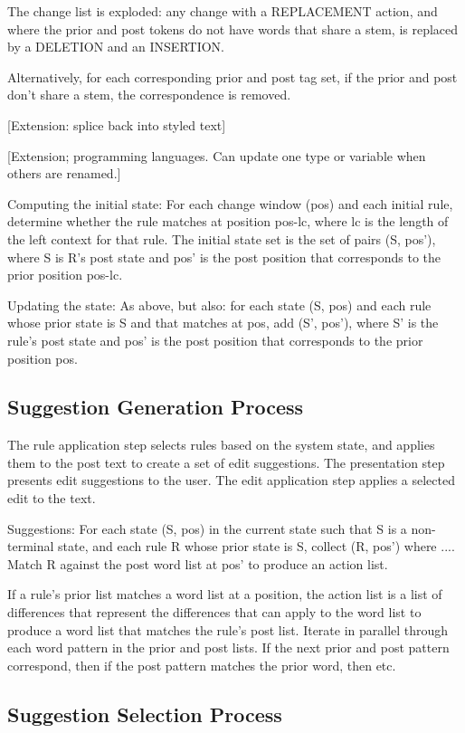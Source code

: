 \documentclass{article}
\begin{document}
The change list is exploded: any change with a REPLACEMENT action, and where the prior and post tokens do not have words that share a stem, is replaced by a DELETION and an INSERTION.

Alternatively, for each corresponding prior and post tag set, if the prior and post don't share a stem, the correspondence is removed.

[Extension: splice back into styled text]

[Extension; programming languages.  Can update one type or variable when others are renamed.]

Computing the initial state: For each change window (pos) and each initial rule, determine whether the rule matches at position pos-lc, where lc is the length of the left context for that rule.  The initial state set is the set of pairs (S, pos'), where S is R's post state and pos' is the post position that corresponds to the prior position pos-lc.

Updating the state: As above, but also: for each state (S, pos) and each rule whose prior state is S and that matches at pos, add (S', pos'), where S' is the rule's post state and pos' is the post position that corresponds to the prior position pos.

\subsection{Suggestion Generation Process}

The rule application step selects rules based on the system state, and applies them to the post text to create a set of edit suggestions.  The presentation step presents edit suggestions to the user.  The edit application step applies a selected edit to the text.

Suggestions: For each state (S, pos) in the current state such that S is a non-terminal state, and each rule R whose prior state is S, collect (R, pos') where ....   Match R against the post word list at pos' to produce an action list.

If a rule's prior list matches a word list at a position, the action list is a list of differences that represent the differences that can apply to the word list to produce a word list that matches the rule's post list.  Iterate in parallel through each word pattern in the prior and post lists.  If the next prior and post pattern correspond, then if the post pattern matches the prior word, then etc.

\subsection{Suggestion Selection Process}
\end{document}
